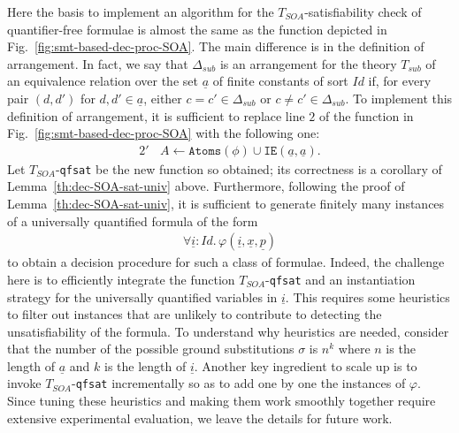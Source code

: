 \documentclass[conference]{IEEEtran}
\begin{document}
\begin{LONG}
Here the basis to implement
an algorithm for the $T_\mathit{SOA}$-satisfiability check of quantifier-free
formulae is almost the same as the function depicted in
Fig.~\ref{fig:smt-based-dec-proc-SOA}.  The main difference is in
the definition of arrangement.  In fact, we say that $\Delta_\mathit{sub}$ is
an arrangement for the theory $T_\mathit{sub}$ of an equivalence relation over
the set $\underline{a}$ of finite constants of sort $\mathit{Id}$ if,
for every pair $(d,d')$ for $d,d'\in \underline{a}$, either $c=c'\in
\Delta_\mathit{sub}$ or $c\neq c'\in \Delta_\mathit{sub}$.  To implement this
definition of arrangement, it is sufficient to replace line $2$ of the
function in Fig.~\ref{fig:smt-based-dec-proc-SOA} with the following
one:
\begin{eqnarray*}
  2' ~~~~ A \longleftarrow \mathtt{Atoms}(\phi) \cup \mathtt{IE}(\underline{a},\underline{a}) .
\end{eqnarray*}
Let $T_\mathit{SOA}$-\texttt{qfsat} be the new function so obtained; its
correctness is a corollary of Lemma~\ref{th:dec-SOA-sat-univ} above.
Furthermore, following the proof of Lemma~\ref{th:dec-SOA-sat-univ},
it is sufficient to generate finitely many instances of a universally
quantified formula of the form 
\begin{eqnarray*}
  \forall \underline{i}:\mathit{Id}.\,
   \varphi(\underline{i},\underline{x},\underline{p}) 
\end{eqnarray*}
to obtain a decision procedure for such a class of formulae.  Indeed,
the challenge here is to efficiently integrate the function
$T_\mathit{SOA}$-\texttt{qfsat} and an instantiation strategy for the
universally quantified variables in $\underline{i}$.  This requires
some heuristics to filter out instances that are unlikely to
contribute to detecting the unsatisfiability of the formula.  To
understand why heuristics are needed, consider that the number of the
possible ground substitutions $\sigma$ is $n^k$ where $n$ is the
length of $\underline{a}$ and $k$ is the length of $\underline{i}$.
Another key ingredient to scale up is to invoke
$T_\mathit{SOA}$-\texttt{qfsat} incrementally so as to add one by one the
instances of $\varphi$.  Since tuning these heuristics and making them
work smoothly together require extensive experimental evaluation, we
leave the details for future work.  

\end{LONG}
\end{document}
